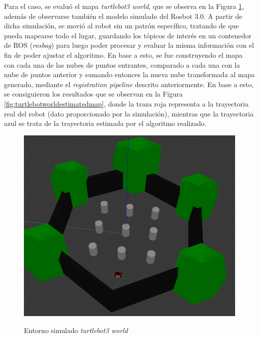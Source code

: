 Para el caso, se evaluó el mapa \textit{turtlebot3 world}, que se observa en la Figura \ref{fig:turtlebotworldoriginalmap}, además de observarse también el modelo simulado del Rosbot 3.0. A partir de dicha simulación, se movió al robot sin un patrón específico, tratando de que pueda mapearse todo el lugar, guardando los tópicos de interés en un contenedor de ROS (\textit{rosbag}) para luego poder procesar y evaluar la misma información con el fin de poder ajustar el algoritmo. En base a esto, se fue construyendo el mapa con cada una de las nubes de puntos entrantes, comparado a cada una con la nube de puntos anterior y sumando entonces la nueva nube transformada al mapa generado, mediante el \textit{registration pipeline} descrito anteriormente. En base a esto, se consiguieron los resultados que se observan en la Figura \ref{fig:turtlebotworldestimatedmap}, donde la traza roja representa a la trayectoria real del robot (dato proporcionado por la simulación), mientras que la trayectoria azul se trata de la trayectoria estimada por el algoritmo realizado.
\begin{figure}[!ht]
    \centering
    {\includegraphics[width=\linewidth]{Img/TurtleBotWorldMap3D.png}}
    \caption{Entorno simulado \textit{turtlebot3 world}}
    \label{fig:turtlebotworldoriginalmap}
\end{figure}
